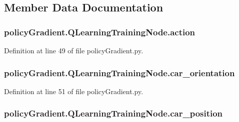 \subsection{Member Data Documentation}
\subsubsection[{\texorpdfstring{action}{action}}]{\setlength{\rightskip}{0pt plus 5cm}policy\+Gradient.\+Q\+Learning\+Training\+Node.\+action}\hypertarget{classpolicy_gradient_1_1_q_learning_training_node_ac952872199643b62f3e383183276864e}{}\label{classpolicy_gradient_1_1_q_learning_training_node_ac952872199643b62f3e383183276864e}


Definition at line 49 of file policy\+Gradient.\+py.

\subsubsection[{\texorpdfstring{car\+\_\+orientation}{car_orientation}}]{\setlength{\rightskip}{0pt plus 5cm}policy\+Gradient.\+Q\+Learning\+Training\+Node.\+car\+\_\+orientation}\hypertarget{classpolicy_gradient_1_1_q_learning_training_node_ad9dc4de3355ebf71e5038b5f44143744}{}\label{classpolicy_gradient_1_1_q_learning_training_node_ad9dc4de3355ebf71e5038b5f44143744}


Definition at line 51 of file policy\+Gradient.\+py.

\subsubsection[{\texorpdfstring{car\+\_\+position}{car_position}}]{\setlength{\rightskip}{0pt plus 5cm}policy\+Gradient.\+Q\+Learning\+Training\+Node.\+car\+\_\+position}\hypertarget{classpolicy_gradient_1_1_q_learning_training_node_a671b5cb52435b882c55f271749ddeb08}{}\label{classpolicy_gradient_1_1_q_learning_training_node_a671b5cb52435b882c55f271749ddeb08}


